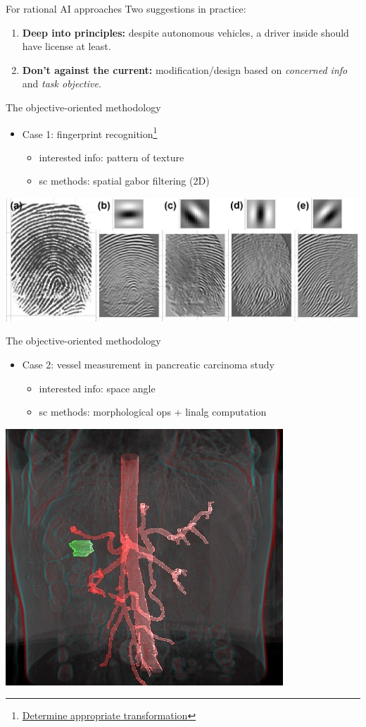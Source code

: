 \documentclass[11pt]{beamer}
\newcommand{\uniitem}[1]{\begin{itemize}\item #1 \end{itemize}}
\newcommand{\ftref}[2]{{\color{blue}\footnotesize \href{#1}{#2}}}
\begin{document}
\begin{frame}{For rational AI approaches}
	Two suggestions in practice:
	\begin{enumerate}
		\item \textbf{Deep into principles:} despite autonomous vehicles, a driver inside should have license at least.
		\item \textbf{Don't against the current:} modification/design based on \emph{concerned info} and \emph{task objective}.
	\end{enumerate}
\end{frame}

\begin{frame}{The objective-oriented methodology}
	\uniitem{Case 1: fingerprint recognition\footnote[frame]{\ftref{https://informatics.readthedocs.io/en/latest/tutorial/tut\_aug.html\#gabor-fingerprint-augmentation}{Determine appropriate transformation}}
		\uniitem{interested info: pattern of texture}
		\uniitem{sc methods: spatial gabor filtering (2D)}}
	\centering
	\includegraphics[scale=0.45]{fingerprint.jpg}
\end{frame}

\begin{frame}{The objective-oriented methodology}
	\uniitem{Case 2: vessel measurement in pancreatic carcinoma study
		\uniitem{interested info: space angle}
		\uniitem{sc methods: morphological ops + linalg computation}}
	\centering
	\includegraphics[scale=0.75]{angle.jpg}
\end{frame}
\end{document}
